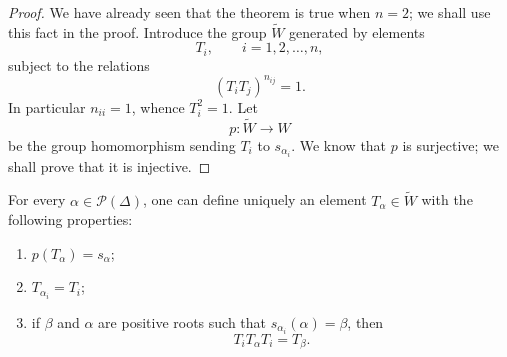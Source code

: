 \begin{proof}
We have already seen that the theorem is true when \(n=2\); we shall
use this fact in the proof. Introduce the group \(\widetilde W\)
generated by elements
\[
 T_i,\qquad i=1,2,\ldots,n,
\]
subject to the relations
\[
 (T_iT_j)^{n_{ij}}=1.
\]
In particular \(n_{ii}=1\), whence \(T_i^2=1\). Let
\[
 p:\widetilde W\longrightarrow W
\]
be the group homomorphism sending \(T_i\) to \(s_{\alpha_i}\). We know
that \(p\) is surjective; we shall prove that it is injective.
\end{proof}

\begin{lemma}\label{sga3:XXI:5.2}
For every \(\alpha\in\mathscr{P}(\Delta)\), one can define uniquely an
element \(T_\alpha\in\widetilde W\) with the following properties:
\begin{enumerate}
\item[(i)] \(p(T_\alpha)=s_\alpha\);
\item[(ii)] \(T_{\alpha_i}=T_i\);
\item[(iii)] if \(\beta\) and \(\alpha\) are positive roots such that
\(s_{\alpha_i}(\alpha)=\beta\), then
\[
 T_iT_\alpha T_i=T_\beta.
\]
\end{enumerate}
\end{lemma}


